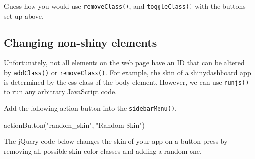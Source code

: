 \documentclass[
  oneside]{book}
\newenvironment{Shaded}{\begin{snugshade}}{\end{snugshade}}
\newcommand{\AttributeTok}[1]{\textcolor[rgb]{0.77,0.63,0.00}{#1}}
\newcommand{\DecValTok}[1]{\textcolor[rgb]{0.00,0.00,0.81}{#1}}
\newcommand{\FunctionTok}[1]{\textcolor[rgb]{0.00,0.00,0.00}{#1}}
\newcommand{\NormalTok}[1]{#1}
\newcommand{\OtherTok}[1]{\textcolor[rgb]{0.56,0.35,0.01}{#1}}
\newcommand{\SpecialCharTok}[1]{\textcolor[rgb]{0.00,0.00,0.00}{#1}}
\newcommand{\StringTok}[1]{\textcolor[rgb]{0.31,0.60,0.02}{#1}}
\begin{document}
\begin{try}
Guess how you would use \texttt{removeClass}\texttt{()}, and \texttt{toggleClass}\texttt{()} with the buttons set up above.

\end{try}

\hypertarget{changing-non-shiny-elements}{%
\subsection{Changing non-shiny elements}\label{changing-non-shiny-elements}}

Unfortunately, not all elements on the web page have an ID that can be altered by \texttt{addClass}\texttt{()} or \texttt{removeClass}\texttt{()}. For example, the skin of a shinydashboard app is determined by the css class of the body element. However, we can use \texttt{runjs}\texttt{()} to run any arbitrary \protect\hyperlink{JavaScript}{JavaScript} code.

Add the following action button into the \texttt{sidebarMenu}\texttt{()}.

\begin{Shaded}
\begin{Highlighting}[]
\FunctionTok{actionButton}\NormalTok{(}\StringTok{"random\_skin"}\NormalTok{, }\StringTok{"Random Skin"}\NormalTok{)}
\end{Highlighting}
\end{Shaded}

The jQuery code below changes the skin of your app on a button press by removing all possible skin-color classes and adding a random one.

\begin{Shaded}
\end{Shaded}
\end{document}
